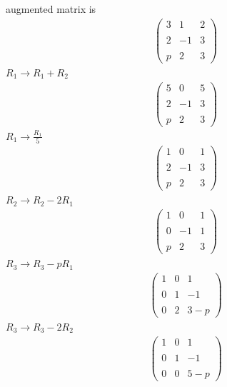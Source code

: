 \documentclass[12pt]{article}
\begin{document}
augmented matrix is
\begin{align}
	\begin{pmatrix}
		3 & 1 & 2 \\ \\
		2 & -1 & 3 \\ \\
		p & 2 & 3
	\end{pmatrix}
\end{align}
$ R_1 \rightarrow R_1 + R_2 $
\begin{align}
	\begin{pmatrix}
		5 & 0 & 5 \\ \\
		2 & -1 & 3 \\ \\
		p & 2 & 3
	\end{pmatrix}
\end{align}
$ R_1 \rightarrow \frac{R_1}{5} $
\begin{align}
	\begin{pmatrix}
		1 & 0 & 1 \\ \\
		2 & -1 & 3 \\ \\
		p & 2 & 3
	\end{pmatrix}
\end{align}
$ R_2 \rightarrow R_2 - 2R_1 $
\begin{align}
	\begin{pmatrix}
		1 & 0 & 1 \\ \\
		0 & -1 & 1 \\ \\
		p & 2 & 3
	\end{pmatrix}
\end{align}
$ R_3 \rightarrow R_3 - pR_1 $
\begin{align}
	\begin{pmatrix}
		1 & 0 & 1 \\ \\
		0 & 1 & -1 \\ \\
		0 & 2 & 3-p
	\end{pmatrix}
\end{align}
$ R_3 \rightarrow R_3 - 2R_2 $
\begin{align}
	\begin{pmatrix}
		1 & 0 & 1 \\ \\
		0 & 1 & -1 \\ \\
		0 & 0 & 5-p
	\end{pmatrix}
\end{align}
\end{document}
